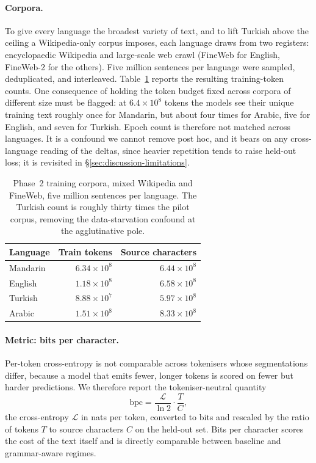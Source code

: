 \paragraph{Corpora.} To give every language the broadest variety of text, and to lift Turkish above the ceiling a Wikipedia-only corpus imposes, each language draws from two registers: encyclopaedic Wikipedia and large-scale web crawl (FineWeb for English, FineWeb-2 for the others). Five million sentences per language were sampled, deduplicated, and interleaved. Table~\ref{tab:phase2-corpus} reports the resulting training-token counts. One consequence of holding the token budget fixed across corpora of different size must be flagged: at $6.4 \times 10^8$ tokens the models see their unique training text roughly once for Mandarin, but about four times for Arabic, five for English, and seven for Turkish. Epoch count is therefore not matched across languages. It is a confound we cannot remove post hoc, and it bears on any cross-language reading of the deltas, since heavier repetition tends to raise held-out loss; it is revisited in \S\ref{sec:discussion-limitations}.

\begin{table}[hbt!]
\centering
\small
\begin{tabular}{lrr}
\toprule
Language & Train tokens & Source characters \\
\midrule
Mandarin & $6.34 \times 10^8$ & $6.44 \times 10^8$ \\
English  & $1.18 \times 10^8$ & $6.58 \times 10^8$ \\
Turkish  & $8.88 \times 10^7$ & $5.97 \times 10^8$ \\
Arabic   & $1.51 \times 10^8$ & $8.33 \times 10^8$ \\
\bottomrule
\end{tabular}
\caption{Phase~2 training corpora, mixed Wikipedia and FineWeb, five million sentences per language. The Turkish count is roughly thirty times the pilot corpus, removing the data-starvation confound at the agglutinative pole.}
\label{tab:phase2-corpus}
\end{table}
\FloatBarrier

\paragraph{Metric: bits per character.} Per-token cross-entropy is not comparable across tokenisers whose segmentations differ, because a model that emits fewer, longer tokens is scored on fewer but harder predictions. We therefore report the tokeniser-neutral quantity
\[
\mathrm{bpc} = \frac{\mathcal{L}}{\ln 2} \cdot \frac{T}{C},
\]
the cross-entropy $\mathcal{L}$ in nats per token, converted to bits and rescaled by the ratio of tokens $T$ to source characters $C$ on the held-out set. Bits per character scores the cost of the text itself and is directly comparable between baseline and grammar-aware regimes.


